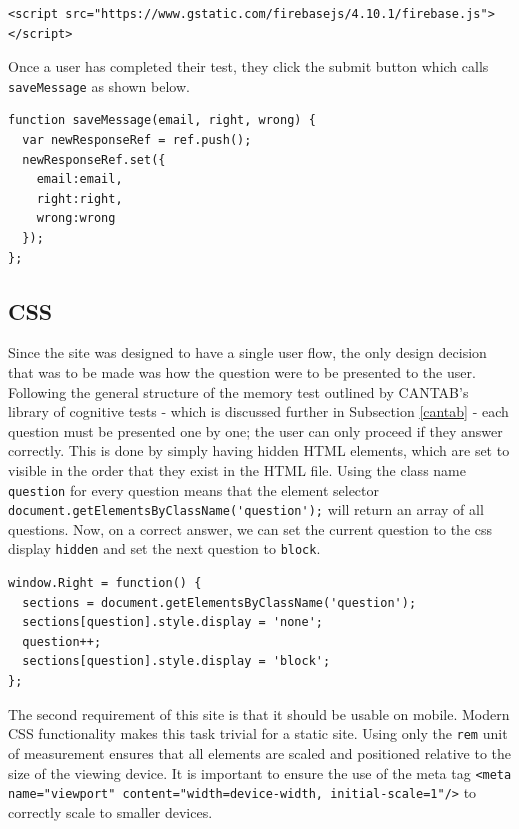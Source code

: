 \documentclass[ %
                    author={Elis Jones},
                supervisor={Dr. Kirsten Cater},
                    degree={BSc},
                     title={The Effect of Presentation Medium on Spatial Cognition},
                  subtitle={in the Virtual Environment},
                      year={2018} ]{dissertation}
\begin{document}
\noindent \begin{minipage}{\textwidth}
\centering
\begin{lstlisting}
<script src="https://www.gstatic.com/firebasejs/4.10.1/firebase.js"></script>
\end{lstlisting}
\end{minipage}

Once a user has completed their test, they click the submit button which calls \lstinline{saveMessage} as shown below.

\bigskip
\noindent \begin{minipage}{\textwidth}
\centering
\begin{lstlisting}
function saveMessage(email, right, wrong) {
  var newResponseRef = ref.push();
  newResponseRef.set({
    email:email,
    right:right,
    wrong:wrong
  });
};
\end{lstlisting}
\end{minipage}

\subsection{CSS}
Since the site was designed to have a single user flow, the only design decision that was to be made was how the question were to be presented to the user. Following the general structure of the memory test outlined by CANTAB's library of cognitive tests - which is discussed further in Subsection \ref{cantab} - each question must be presented one by one; the user can only proceed if they answer correctly. This is done by simply having hidden HTML elements, which are set to visible in the order that they exist in the HTML file. Using the class name \lstinline{question} for every question means that the element selector \lstinline{document.getElementsByClassName('question');} will return an array of all questions. Now, on a correct answer, we can set the current question to the css display \lstinline{hidden} and set the next question to \lstinline{block}.

\begin{minipage}{\textwidth}
\centering
\begin{lstlisting}
window.Right = function() {
  sections = document.getElementsByClassName('question');
  sections[question].style.display = 'none';
  question++;
  sections[question].style.display = 'block';
};
\end{lstlisting}
\end{minipage}

The second requirement of this site is that it should be usable on mobile. Modern CSS functionality makes this task trivial for a static site. Using only the \lstinline{rem} unit of measurement ensures that all elements are scaled and positioned relative to the size of the viewing device. It is important to ensure the use of the meta tag \lstinline{<meta name="viewport" content="width=device-width, initial-scale=1"/>} to correctly scale to smaller devices. 
\end{document}
